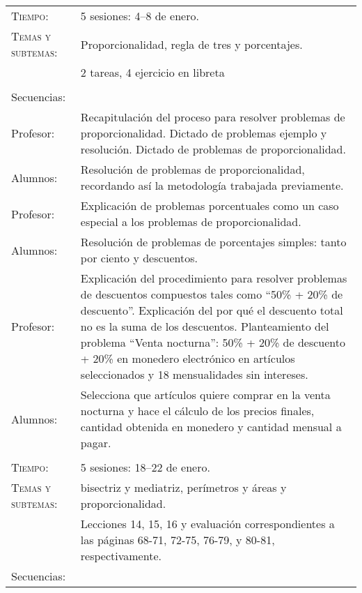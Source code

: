 \documentclass[letterpaper,10pt]{article}
\begin{document}
\begin{tabular}[t]{R{0.25\textwidth}p{0.71\textwidth}}
    \textsc{Tiempo:}          & 5 sesiones: 4--8  de enero. \\
    \textsc{Temas y subtemas:}& Proporcionalidad, regla de tres y porcentajes.\\
    & 2 tareas, 4 ejercicio en libreta\\ \\
    \large{\sc Secuencias:} \\
    
    Profesor:   & Recapitulaci\'on del proceso para resolver problemas de
    proporcionalidad. Dictado de problemas ejemplo y resoluci\'on. Dictado de
    problemas de proporcionalidad.\\    
    Alumnos:     & Resoluci\'on de problemas de proporcionalidad, recordando
    as\'i la metodolog\'ia trabajada previamente.  \\
    Profesor:   & Explicaci\'on de problemas porcentuales como un caso especial
    a los problemas de proporcionalidad. \\    
    Alumnos:     & Resoluci\'on de problemas de porcentajes simples: tanto por
    ciento y descuentos. \\    
    Profesor:   & Explicaci\'on del procedimiento para resolver problemas de
    descuentos compuestos tales como ``50\% + 20\% de descuento''. Explicaci\'on
    del por qu\'e el descuento total no es la suma de los descuentos.
    Planteamiento del problema ``Venta nocturna'': 50\% + 20\% de descuento +
    20\% en monedero electr\'onico en art\'iculos seleccionados y 18
    mensualidades sin intereses. \\ Alumnos:     & Selecciona que art\'iculos
    quiere comprar en la venta nocturna y hace el c\'alculo de los precios
    finales, cantidad obtenida en monedero y cantidad mensual a pagar.
\\ \hline \\
    \textsc{Tiempo:}           & 5 sesiones: 18--22  de enero. \\
    \textsc{Temas y subtemas:} & bisectriz y mediatriz, per\'imetros y \'areas
    y proporcionalidad.\\
     & Lecciones 14, 15, 16 y evaluaci\'on 
    correspondientes a las p\'aginas 68-71, 72-75, 76-79, y 80-81, 
    respectivamente.\\ 
    \large{\sc Secuencias:} \\


\end{tabular}
\end{document}
